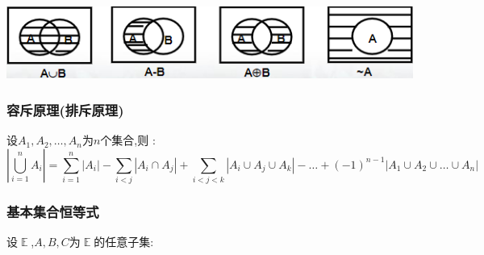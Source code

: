 \documentclass[UTF8,12pt]{ctexbook}
\newcommand{\upDownSum}[2]{\sum\limits_{#2}^{#1}}
\newcommand{\updownUnion}[2]{\bigcup\limits_{#2}^{#1}}
\newcommand{\absoluteValue}[1]{\left\lvert #1 \right\vert}
\DeclareMathOperator{\mathEverythingCollection}{\mathbb{E}}
\DeclareMathOperator{\unionSet}{\cup}
\DeclareMathOperator{\intersectionSet}{\cap}
\begin{document}
{{{{{  \begin{center}
    \includegraphics{resources/Venn's_diagram.png}
  \end{center}
}%

\subsubsection{容斥原理(排斥原理)}{
  设$A_1,A_2,\dots,A_n$为$n$个集合,则 : $$
    \absoluteValue{\updownUnion{n}{i = 1}A_i} = \upDownSum{n}{i = 1}\absoluteValue{A_i} - \upDownSum{\ }{i < j}\absoluteValue{A_i \intersectionSet A_j} + \upDownSum{\ }{i < j < k}\absoluteValue{A_i \unionSet A_j \unionSet A_k} - \dots + (-1)^{n - 1}\absoluteValue{A_1 \unionSet A_2 \unionSet \dots \unionSet A_n}
  $$
}

\subsubsection{基本集合恒等式}{
  设$\mathEverythingCollection$,$A,B,C$为$\mathEverythingCollection$的任意子集:

}}}}}
\end{document}
